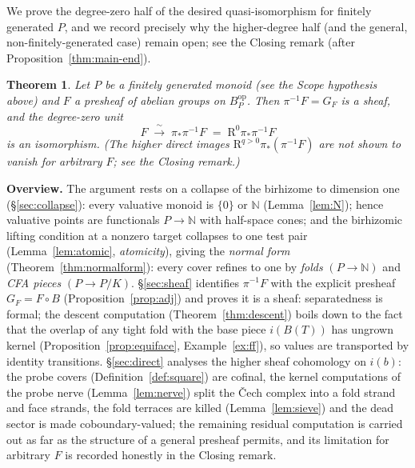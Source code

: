 \documentclass[11pt]{article}
\newtheorem{theorem}{Theorem}[section]
\theoremstyle{definition}
\newcommand{\op}{\mathrm{op}}
\begin{document}
We prove the degree-zero half of the desired quasi-isomorphism for
finitely generated $P$, and we record precisely why the higher-degree
half (and the general, non-finitely-generated case) remain open; see
the Closing remark (after Proposition~\ref{thm:main-end}).

\begin{theorem}\label{thm:main}
Let $P$ be a \emph{finitely generated} monoid \textup{(}see the Scope
hypothesis above\textup{)} and $F$ a presheaf of abelian groups on
$B_P^{\op}$. Then $\pi^{-1}F=G_F$ is a sheaf, and the degree-zero
unit
\[
F\;\xrightarrow{\ \sim\ }\;\pi_{*}\pi^{-1}F
\;=\;\mathrm R^{0}\pi_{*}\pi^{-1}F
\]
is an isomorphism. \textup{(}The higher direct images
$\mathrm R^{q>0}\pi_{*}(\pi^{-1}F)$ are \emph{not} shown to vanish
for arbitrary $F$; see the Closing remark.\textup{)}
\end{theorem}

\noindent\textbf{Overview.}
The argument rests on a collapse of the birhizome 
to dimension one
(\S\ref{sec:collapse}): every valuative monoid is $\{0\}$ or $\mathbb N$
(Lemma~\ref{lem:N}); hence valuative points are functionals
$P\to\mathbb N$ with half-space cones; and the birhizomic lifting
condition at a nonzero target collapses to one test pair
(Lemma~\ref{lem:atomic}, \emph{atomicity}), giving the \emph{normal
form} (Theorem~\ref{thm:normalform}): every cover refines to one by
\emph{folds} $(P\to\mathbb N)$ and \emph{CFA pieces} $(P\to P/K)$.
\S\ref{sec:sheaf} identifies $\pi^{-1}F$ with the explicit presheaf
$G_F=F\circ B$ (Proposition~\ref{prop:adj}) and proves it is a sheaf:
separatedness is formal; the descent computation
(Theorem~\ref{thm:descent}) boils down to the fact that the overlap of
any tight fold with the base piece $i(B(T))$ has ungrown kernel
(Proposition~\ref{prop:equiface}, Example~\ref{ex:ff}), so values are
transported by identity transitions. \S\ref{sec:direct} analyses the
higher sheaf cohomology on $i(b)$: the probe covers
(Definition~\ref{def:square}) are cofinal, the kernel computations of
the probe nerve (Lemma~\ref{lem:nerve}) split the \v{C}ech complex
into a fold strand and face strands, the fold terraces are killed
(Lemma~\ref{lem:sieve}) and the dead sector is made coboundary-valued;
the remaining residual computation is carried out as far as the
structure of a general presheaf permits, and its limitation for
arbitrary $F$ is recorded honestly in the Closing remark.
\end{document}
